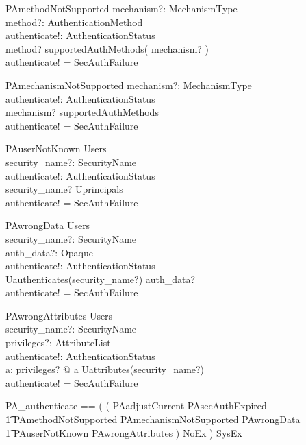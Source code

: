 \begin{schema}{PAmethodNotSupported}
  mechanism?: MechanismType \\
  method?: AuthenticationMethod \\
  authenticate!: AuthenticationStatus \\
  \where  
  method? \notin supportedAuthMethods( mechanism? ) \\
  authenticate! = SecAuthFailure \\
\end{schema}
\begin{schema}{PAmechanismNotSupported}
  mechanism?: MechanismType \\
  authenticate!: AuthenticationStatus \\
  \where  
  mechanism? \notin \dom supportedAuthMethods \\
  authenticate! = SecAuthFailure \\
\end{schema}
\begin{schema}{PAuserNotKnown}
  \Xi Users \\
  security\_name?: SecurityName \\
  authenticate!: AuthenticationStatus \\
  \where  
  security\_name? \notin Uprincipals \\
  authenticate! = SecAuthFailure \\
\end{schema}
\begin{schema}{PAwrongData}
  \Xi Users \\
  security\_name?: SecurityName \\
  auth\_data?: Opaque \\
  authenticate!: AuthenticationStatus \\
  \where  
  Uauthenticates(security\_name?) \neq auth\_data? \\
  authenticate! = SecAuthFailure \\
\end{schema}
\begin{schema}{PAwrongAttributes}
  \Xi Users \\
  security\_name?: SecurityName \\
  privileges?: AttributeList \\
  authenticate!: AuthenticationStatus \\
  \where  
  \exists a: \ran privileges? @ a \notin Uattributes(security\_name?) \\
  authenticate! = SecAuthFailure \\
\end{schema}
\begin{zed}
  PA\_authenticate == ( ( PAadjustCurrent \lor PAsecAuthExpired \\
  \t1 \lor PAmethodNotSupported \lor PAmechanismNotSupported \lor PAwrongData \\
  \t1  \lor PAuserNotKnown \lor PAwrongAttributes ) \land NoEx ) \lor SysEx \\ 
\end{zed}


